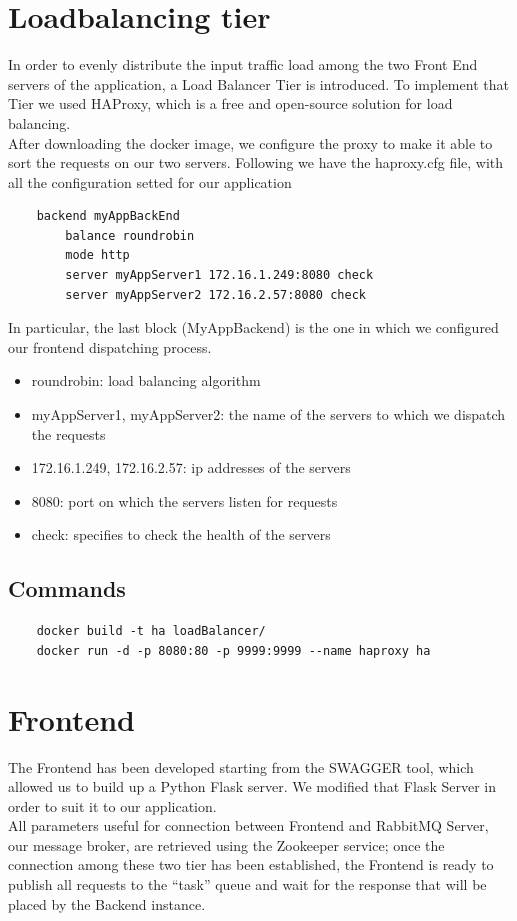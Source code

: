 \documentclass{article}
\begin{document}
\section{Loadbalancing tier}
In order to evenly distribute the input traffic load among the two Front End servers of the application, a Load Balancer Tier is introduced. To implement that Tier we used HAProxy, which is a free and open-source solution for load balancing. \\
After downloading the docker image, we configure the proxy to make it able to sort the requests on our two servers. Following we have the haproxy.cfg file, with all the configuration setted for our application
\begin{verbatim}
    backend myAppBackEnd
        balance roundrobin
        mode http
        server myAppServer1 172.16.1.249:8080 check
        server myAppServer2 172.16.2.57:8080 check
\end{verbatim}
\vspace{3mm}
In particular, the last block (MyAppBackend) is the one in which we configured our frontend dispatching process. 
\begin{itemize}
\item roundrobin: load balancing algorithm
\item myAppServer1, myAppServer2: the name of the servers to which we dispatch the requests
\item 172.16.1.249, 172.16.2.57: ip addresses of the servers
\item 8080: port on which the servers listen for requests
\item check: specifies to check the health of the servers
\end{itemize}
\subsection{Commands}  
\begin{verbatim}
    docker build -t ha loadBalancer/
    docker run -d -p 8080:80 -p 9999:9999 --name haproxy ha
\end{verbatim}




\section{Frontend}
The Frontend has been developed starting from the SWAGGER tool, which allowed us to build up a Python Flask server. We modified that Flask Server in order to suit it to our application.\\
All parameters useful for connection between Frontend and RabbitMQ Server, our message broker, are retrieved using the Zookeeper service; once the connection among these two tier has been established, the Frontend is ready to publish all requests to the “task” queue and wait for the response that will be placed by the Backend instance. 
\end{document}
